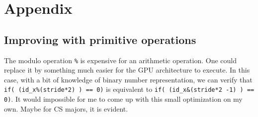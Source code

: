 \documentclass[12pt]{article}
\begin{document}
%

\section{Appendix}
\subsection*{Improving with primitive operations}\label{App.:Primitive operations}
The modulo operation \verb|%| is expensive for an arithmetic operation. One could replace it 
by something much easier for the GPU architecture to execute. In this case, with a bit of 
knowledge of binary number representation, we can verify that \verb|if( (id_x%(stride*2) ) == 0)| is 
equivalent to \verb|if( (id_x&(stride*2 -1) ) == 0)|. It would impossible for me to come up with this small 
optimization on my own. Maybe for CS majors, it is evident.

\newpage


\end{document}
